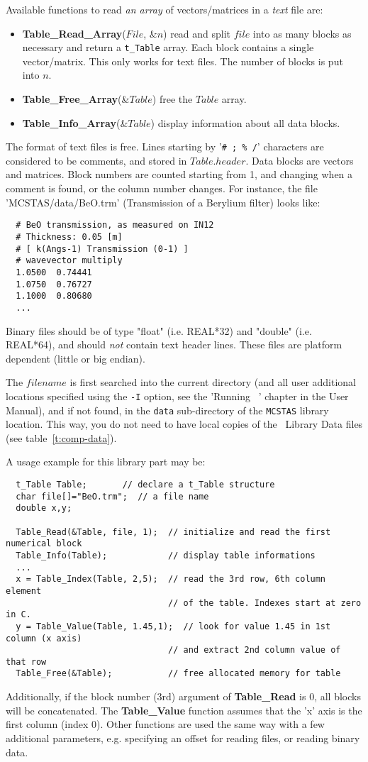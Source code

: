 Available functions to read \emph{an array} of vectors/matrices in a \emph{text} file are:
\begin{itemize}
\item {\bf Table\_Read\_Array}($File$, \&$n$) read and split $file$
into as many blocks as necessary and return a \verb+t_Table+ array.
Each block contains a single vector/matrix. This only works for text files.
The number of blocks is put into $n$.
\item {\bf Table\_Free\_Array}(\&$Table$) free the $Table$ array.
\item {\bf Table\_Info\_Array}(\&$Table$) display information about all data blocks.
\end{itemize}

The format of text files is free. Lines starting by '\verb+# ; % /+' characters are considered to be comments, and stored in $Table.header$. Data blocks are vectors and matrices. Block numbers are counted starting from 1, and changing when a comment is found, or the column number changes. For instance, the file 'MCSTAS/data/BeO.trm' (Transmission of a Berylium filter) looks like:
\begin{verbatim}
  # BeO transmission, as measured on IN12
  # Thickness: 0.05 [m]
  # [ k(Angs-1) Transmission (0-1) ]
  # wavevector multiply
  1.0500  0.74441
  1.0750  0.76727
  1.1000  0.80680
  ...
\end{verbatim}
Binary files should be of type "float" (i.e. REAL*32) and "double" (i.e. REAL*64),
and should \emph{not} contain text header lines. These files are platform
dependent (little or big endian).

The $filename$ is first searched into the current directory (and all user additional locations specified using the \verb+-I+ option, see the 'Running \MCS\ ' chapter in the User Manual), and if not found, in the \verb+data+ sub-directory of the \verb+MCSTAS+ library location. 
 This way, you do not need to have local copies of the \MCS\ Library Data files (see table~\ref{t:comp-data}).

A usage example for this library part may be:
\begin{verbatim}
  t_Table Table;       // declare a t_Table structure
  char file[]="BeO.trm";  // a file name
  double x,y;

  Table_Read(&Table, file, 1);  // initialize and read the first numerical block
  Table_Info(Table);            // display table informations
  ...
  x = Table_Index(Table, 2,5);  // read the 3rd row, 6th column element
                                // of the table. Indexes start at zero in C.
  y = Table_Value(Table, 1.45,1);  // look for value 1.45 in 1st column (x axis)
                                // and extract 2nd column value of that row
  Table_Free(&Table);           // free allocated memory for table
\end{verbatim}
Additionally, if the block number (3rd) argument of  {\bf Table\_Read} is 0, all blocks will be concatenated.
The {\bf Table\_Value} function assumes that the 'x' axis is the first column (index 0).
Other functions are used the same way with a few additional parameters, e.g. specifying an offset for reading files, or reading binary data.

